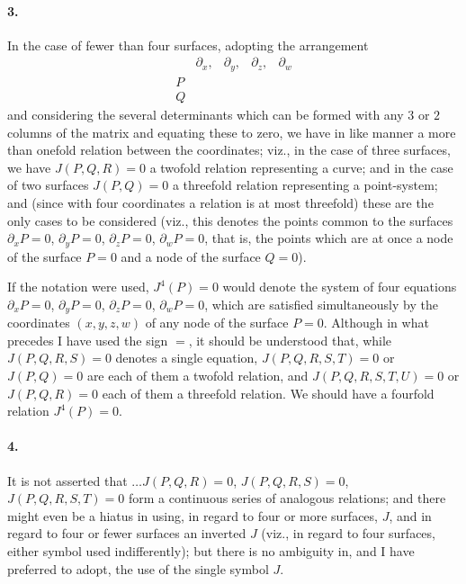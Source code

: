 \documentclass[11pt,a4paper]{article}
\begin{document}
\paragraph{3.}
In the case of fewer than four surfaces, adopting the arrangement
\[
\begin{array}{c|cccc}
 & \partial_x, & \partial_y, & \partial_z, & \partial_w \\\hline
P & & & & \\
Q & & & &
\end{array}
\]
and considering the several determinants which can be formed with any $3$ or $2$ columns of
the matrix and equating these to zero, we have in like manner a more than onefold relation
between the coordinates; viz., in the case of three surfaces, we have $J(P, Q, R) = 0$ a
twofold relation representing a curve; and in the case of two surfaces $J(P, Q) = 0$ a
threefold relation representing a point-system; and (since with four coordinates a relation
is at most threefold) these are the only cases to be considered (viz., this denotes the
points common to the surfaces $\partial_x P = 0$, $\partial_y P = 0$, $\partial_z P = 0$,
$\partial_w P = 0$, that is, the points which are at once a node of the surface $P = 0$ and
a node of the surface $Q = 0$).

If the notation were used, $J^4(P) = 0$ would denote the system of four equations
$\partial_x P = 0$, $\partial_y P = 0$, $\partial_z P = 0$, $\partial_w P = 0$, which are
satisfied simultaneously by the coordinates $(x, y, z, w)$ of any node of the surface
$P = 0$. Although in what precedes I have used the sign $=$, it should be understood that,
while $J(P, Q, R, S) = 0$ denotes a single equation, $J(P, Q, R, S, T) = 0$ or
$J(P, Q) = 0$ are each of them a twofold relation, and $J(P, Q, R, S, T, U) = 0$ or
$J(P, Q, R) = 0$ each of them a threefold relation. We should have a fourfold relation
$J^4(P) = 0$.

\paragraph{4.}
It is not asserted that $\ldots J(P, Q, R) = 0$, $J(P, Q, R, S) = 0$, $J(P, Q, R, S, T) = 0$
form a continuous series of analogous relations; and there might even be a hiatus in using,
in regard to four or more surfaces, $J$, and in regard to four or fewer surfaces an
inverted $J$ (viz., in regard to four surfaces, either symbol used indifferently); but
there is no ambiguity in, and I have preferred to adopt, the use of the single symbol $J$.
\end{document}

